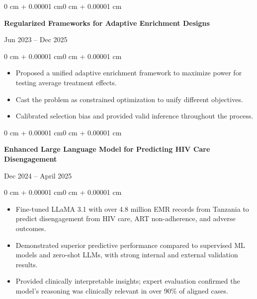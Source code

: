 \documentclass[10pt, letterpaper]{article}
\newenvironment{highlights}{
    \begin{itemize}[
        topsep=0.10 cm,
        parsep=0.10 cm,
        partopsep=0pt,
        itemsep=0pt,
        leftmargin=0 cm + 10pt
    ]
}{\end{itemize}}
\newenvironment{onecolentry}{
    \begin{adjustwidth}{0 cm + 0.00001 cm}{0 cm + 0.00001 cm}
}{\end{adjustwidth}}
\newenvironment{twocolentry}[2][]{
    \onecolentry
    \def\secondColumn{#2}
    \noindent\begin{minipage}[t]{\dimexpr\linewidth-4.7cm\relax}
}{
    \end{minipage}\hfill
    \begin{minipage}[t]{4.5cm}
        \raggedleft \secondColumn
    \end{minipage}
    \endonecolentry
}
\begin{document}
   \begin{twocolentry}{Jun 2023 -- Dec 2025}
        \textbf{Regularized Frameworks for  Adaptive Enrichment Designs}\\
    \end{twocolentry}
    \vspace{0.05 cm}
    \begin{onecolentry}
        \begin{highlights}
            \item Proposed a unified adaptive enrichment framework to maximize power for testing average treatment effects.
            \item Cast the problem as constrained optimization to unify different objectives.
            \item Calibrated selection bias and provided valid inference throughout the process.
        \end{highlights}
    \end{onecolentry}

\vspace{0.10 cm}
\begin{twocolentry}{Dec 2024 -- April 2025}
    \textbf{Enhanced Large Language Model for Predicting HIV Care Disengagement }\\
\end{twocolentry}
\vspace{0.05 cm}
\begin{onecolentry}
    \begin{highlights}
        \item Fine-tuned LLaMA 3.1 with over 4.8 million EMR records from Tanzania to predict disengagement from HIV care, ART non-adherence, and adverse outcomes.  
        \item Demonstrated superior predictive performance compared to supervised ML models and zero-shot LLMs, with strong internal and external validation results.  
        \item Provided clinically interpretable insights; expert evaluation confirmed the model's reasoning was clinically relevant in over 90\% of aligned cases.  
    \end{highlights}
\end{onecolentry}
\vspace{0.10 cm}
\end{document}
